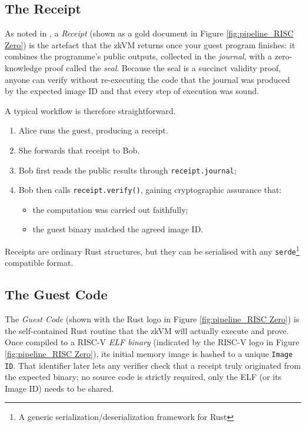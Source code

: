 \subsection{The Receipt} \makeatletter{}\makeatother
\label{receipt}
As noted in \cite{risc0_receipt}, a \textit{Receipt} (shown as a gold document in Figure \ref{fig:pipeline_RISC Zero}) is the artefact that the zkVM returns once your guest program finishes: it combines the programme’s public outputs, collected in the \textit{journal}, with a zero-knowledge proof called the \textit{seal}.  
Because the seal is a succinct validity proof, anyone can verify without re-executing the code that the journal was produced by the expected image ID and that every step of execution was sound.

A typical workflow is therefore straightforward.  
\begin{enumerate}
  \item Alice runs the guest, producing a receipt.  
  \item She forwards that receipt to Bob.  
  \item Bob first reads the public results through \texttt{receipt.journal};  
  \item Bob then calls \texttt{receipt.verify()}, gaining cryptographic assurance that:
        \begin{itemize}
          \item the computation was carried out faithfully;  
          \item the guest binary matched the agreed image ID.  
        \end{itemize}
\end{enumerate}

Receipts are ordinary Rust structures, but they can be serialised with any \texttt{serde}\footnote{A generic serialization/deserialization framework for Rust} compatible format.


\subsection{The Guest Code}\makeatletter{}\makeatother
\label{guestcode}

The \textit{Guest Code} (shown with the Rust logo in Figure \ref{fig:pipeline_RISC Zero}) is the self-contained Rust routine that the zkVM will actually execute and prove.  
Once compiled to a RISC-V \textit{ELF binary} (indicated by the RISC-V logo in Figure \ref{fig:pipeline_RISC Zero}), its initial memory image is hashed to a unique \texttt{Image ID}.  
That identifier later lets any verifier check that a receipt truly originated from the expected binary; no source code is strictly required, only the ELF (or its Image ID) needs to be shared.  

